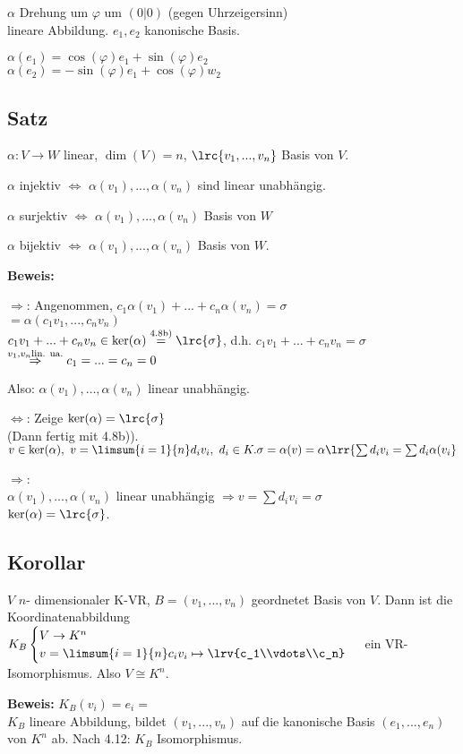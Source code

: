   $\alpha$ Drehung um $\varphi$ um $(0|0)$ (gegen Uhrzeigersinn)\\
  lineare Abbildung. $e_1,e_2$ kanonische Basis.

  $\alpha(e_1)=\cos(\varphi)e_1+\sin(\varphi)e_2$\\
  $\alpha(e_2)=-\sin(\varphi)e_1+\cos(\varphi)w_2$

  \subsection{Satz}

  $\alpha:V\rightarrow W$ linear, $\dim(V)=n$, $\lrc{v_1,...,v_n}$ Basis von $V$.

    \item $\alpha$ injektiv $\Leftrightarrow$ $\alpha(v_1),...,\alpha(v_n)$
      sind linear unabhängig.
    \item $\alpha$ surjektiv $\Leftrightarrow$ $\alpha(v_1),...,\alpha(v_n)$
      Basis von $W$
    \item $\alpha$ bijektiv $\Leftrightarrow$ $\alpha(v_1),...,\alpha(v_n)$
      Basis von $W$.
  \subExEnd

  \textbf{Beweis:}
    \item
      $\Rightarrow$: Angenommen, $c_1\alpha(v_1)+...+c_n\alpha(v_n)=\sigma$\\
      $=\alpha(c_1v_1,...,c_nv_n)$\\
      $c_1v_1+...+c_nv_n\in\mbox{ker}(\alpha)\overset{\mbox{\scriptsize 4.8b)}}{=}\lrc{\sigma}$, d.h. $c_1v_1+...+c_nv_n=\sigma$\\
      $\overset{v_1,v_n\mbox{\scriptsize lin. ua.}}{\Rightarrow} c_1=...=c_n=0$

      Also: $\alpha(v_1),\dots,\alpha(v_n)$ linear unabhängig.

      $\Leftrightarrow$: Zeige $\mbox{ker}(\alpha)=\lrc{\sigma}$\\
      (Dann fertig mit 4.8b)).\\
      $v\in\mbox{ker}(\alpha),\ v=\limsum{i=1}{n}d_iv_i,\ d_i\in K.\\
      \sigma=\alpha(v)=\alpha\lrr{\sum d_iv_i=\sum d_i\alpha(v_i}$

      $\Rightarrow$:\\
      $\alpha(v_1),...,\alpha(v_n)$ linear unabhängig $\Rightarrow v=\sum
      d_iv_i=\sigma$\\
      $\mbox{ker}(\alpha)=\lrc{\sigma}$.
  \subExEnd

\subsection{Korollar}
  $V$ $n$- dimensionaler K-VR, $B=(v_1,...,v_n)$ geordnetet Basis von $V$. Dann
ist die Koordinatenabbildung $K_B\begin{cases}V\rightarrow
K^n\\v=\limsum{i=1}{n}c_iv_i\mapsto\lrv{c_1\\vdots\\c_n}\end{cases}$ ein VR-
Isomorphismus. Also $V\cong K^n$.

  \textbf{Beweis:} $K_B(v_i)=e_i=$\\
  $K_B$ lineare Abbildung, bildet $(v_1,...,v_n)$ auf die kanonische Basis
  $(e_1,...,e_n)$ von $K^n$ ab. Nach 4.12: $K_B$ Isomorphismus.

